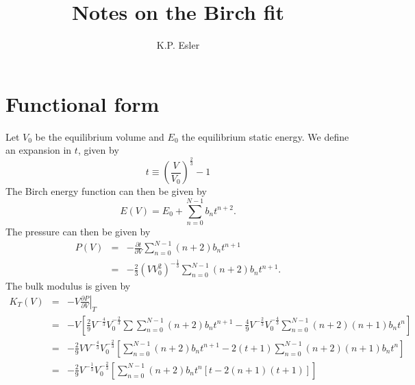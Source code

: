 \documentclass{article}
\title{Notes on the Birch fit}
\author{K.P. Esler}
\begin{document}
\maketitle
\section{Functional form}
Let $V_0$ be the equilibrium volume and $E_0$ the equilibrium static
energy.  We define an expansion in $t$, given by
\begin{equation}
t \equiv \left(\frac{V}{V_0}\right)^\frac{2}{3} - 1
\end{equation}
The Birch energy function can then be given by
\begin{equation}
E(V) = E_0 + \sum_{n=0}^{N-1} b_n t^{n+2}.
\end{equation}
The pressure can then be given by
\begin{eqnarray}
P(V) & = & -\frac{\partial t}{\partial V}\sum_{n=0}^{N-1} (n+2)b_n
t^{n+1} \\
& = & -\frac{2}{3} (VV_0^2)^{-\frac{1}{3}} \sum_{n=0}^{N-1} (n+2)b_n
t^{n+1}.
\end{eqnarray}
The bulk modulus is given by
\begin{eqnarray}
K_T(V) & = & -V\left.\frac{\partial P}{\partial V}\right|_T \nonumber \\
& = & -V\left[\frac{2}{9}V^{-\frac{4}{3}}V_0^{-\frac{2}{3}} \sum
\sum_{n=0}^{N-1} (n+2)b_n t^{n+1} -
\frac{4}{9}V^{-\frac{2}{3}}V_0^{-\frac{4}{3}} \sum_{n=0}^{N-1}
(n+2)(n+1) b_n t^n \right]\nonumber \\
& = & -\frac{2}{9} V V^{-\frac{4}{3}} V_0^{-\frac{2}{3}} \left[
\sum_{n=0}^{N-1} (n+2)b_n t^{n+1} - 2(t+1)\sum_{n=0}^{N-1} (n+2)(n+1)
b_n t^n \right] \\
& = & -\frac{2}{9} V^{-\frac{1}{3}} V_0^{-\frac{2}{3}} \left[
\sum_{n=0}^{N-1} (n+2)b_n t^n \left[t -2(n+1)(t+1)\right]
\right]
\end{eqnarray}
\end{document}
